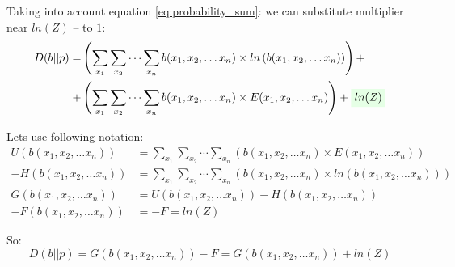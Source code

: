 \documentclass[fleqn,leqno]{article}
\newcommand{\highlight}[1]{\colorbox{green!10}{$\displaystyle#1$}}
\begin{document}
Taking into account equation \eqref{eq:probability_sum}: we can substitute multiplier near $ln(Z)$ -- to $1$:
\begin{equation}
\begin{split}
D(b||p) = & \left( \sum_{x_1} \sum_{x_2} \cdots \sum_{x_n} b(x_1, x_2, \dots x_n) \times ln \left( b(x_1, x_2, \dots x_n) \right) \right) + \\
            + & \left( \sum_{x_1} \sum_{x_2} \cdots \sum_{x_n} b(x_1, x_2, \dots x_n) \times E(x_1, x_2, \dots x_n) \right) + \highlight{ ln(Z) }
\end{split}
\end{equation}

Lets use following notation:
\begin{equation}
\begin{split}
U(b(x_1,x_2,\dots x_n))  & = \sum_{x_1} \sum_{x_2} \cdots \sum_{x_n} \left( b(x_1, x_2, \dots x_n) \times E(x_1, x_2, \dots x_n) \right) \\
-H(b(x_1,x_2,\dots x_n)) & = \sum_{x_1} \sum_{x_2} \cdots \sum_{x_n} \left( b(x_1, x_2, \dots x_n) \times ln \left( b(x_1, x_2, \dots x_n) \right) \right) \\
G(b(x_1,x_2,\dots x_n))  & = U(b(x_1,x_2,\dots x_n)) - H(b(x_1,x_2,\dots x_n)) \\
-F(b(x_1,x_2,\dots x_n)) & = -F = ln(Z)
\end{split}
\end{equation}

So:
\begin{equation}
D(b||p) = G(b(x_1,x_2,\dots x_n)) - F = G(b(x_1,x_2,\dots x_n)) + ln(Z)
\end{equation}
\end{document}

